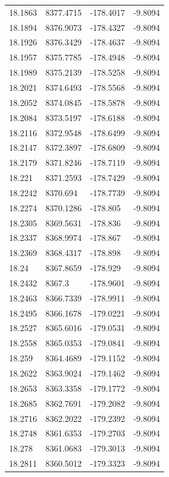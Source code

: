 \begin{table}[H]
\begin{tabular}{llll}
18.1863 & 8377.4715 & -178.4017 & -9.8094 \\
18.1894 & 8376.9073 & -178.4327 & -9.8094 \\
18.1926 & 8376.3429 & -178.4637 & -9.8094 \\
18.1957 & 8375.7785 & -178.4948 & -9.8094 \\
18.1989 & 8375.2139 & -178.5258 & -9.8094 \\
18.2021 & 8374.6493 & -178.5568 & -9.8094 \\
18.2052 & 8374.0845 & -178.5878 & -9.8094 \\
18.2084 & 8373.5197 & -178.6188 & -9.8094 \\
18.2116 & 8372.9548 & -178.6499 & -9.8094 \\
18.2147 & 8372.3897 & -178.6809 & -9.8094 \\
18.2179 & 8371.8246 & -178.7119 & -9.8094 \\
18.221 & 8371.2593 & -178.7429 & -9.8094 \\
18.2242 & 8370.694 & -178.7739 & -9.8094 \\
18.2274 & 8370.1286 & -178.805 & -9.8094 \\
18.2305 & 8369.5631 & -178.836 & -9.8094 \\
18.2337 & 8368.9974 & -178.867 & -9.8094 \\
18.2369 & 8368.4317 & -178.898 & -9.8094 \\
18.24 & 8367.8659 & -178.929 & -9.8094 \\
18.2432 & 8367.3 & -178.9601 & -9.8094 \\
18.2463 & 8366.7339 & -178.9911 & -9.8094 \\
18.2495 & 8366.1678 & -179.0221 & -9.8094 \\
18.2527 & 8365.6016 & -179.0531 & -9.8094 \\
18.2558 & 8365.0353 & -179.0841 & -9.8094 \\
18.259 & 8364.4689 & -179.1152 & -9.8094 \\
18.2622 & 8363.9024 & -179.1462 & -9.8094 \\
18.2653 & 8363.3358 & -179.1772 & -9.8094 \\
18.2685 & 8362.7691 & -179.2082 & -9.8094 \\
18.2716 & 8362.2022 & -179.2392 & -9.8094 \\
18.2748 & 8361.6353 & -179.2703 & -9.8094 \\
18.278 & 8361.0683 & -179.3013 & -9.8094 \\
18.2811 & 8360.5012 & -179.3323 & -9.8094 \\

\end{tabular}
\end{table}
